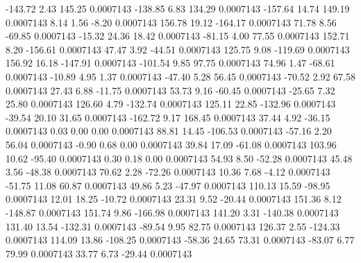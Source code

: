      -143.72        2.43      145.25     0.0007143
     -138.85        6.83      134.29     0.0007143
     -157.64       14.74      149.19     0.0007143
        8.14        1.56       -8.20     0.0007143
      156.78       19.12     -164.17     0.0007143
       71.78        8.56      -69.85     0.0007143
      -15.32       24.36       18.42     0.0007143
      -81.15        4.00       77.55     0.0007143
      152.71        8.20     -156.61     0.0007143
       47.47        3.92      -44.51     0.0007143
      125.75        9.08     -119.69     0.0007143
      156.92       16.18     -147.91     0.0007143
     -101.54        9.85       97.75     0.0007143
       74.96        1.47      -68.61     0.0007143
      -10.89        4.95        1.37     0.0007143
      -47.40        5.28       56.45     0.0007143
      -70.52        2.92       67.58     0.0007143
       27.43        6.88      -11.75     0.0007143
       53.73        9.16      -60.45     0.0007143
      -25.65        7.32       25.80     0.0007143
      126.60        4.79     -132.74     0.0007143
      125.11       22.85     -132.96     0.0007143
      -39.54       20.10       31.65     0.0007143
     -162.72        9.17      168.45     0.0007143
       37.44        4.92      -36.15     0.0007143
        0.03        0.00        0.00     0.0007143
       88.81       14.45     -106.53     0.0007143
      -57.16        2.20       56.04     0.0007143
       -0.90        0.68        0.00     0.0007143
       39.84       17.09      -61.08     0.0007143
      103.96       10.62      -95.40     0.0007143
        0.30        0.18        0.00     0.0007143
       54.93        8.50      -52.28     0.0007143
       45.48        3.56      -48.38     0.0007143
       70.62        2.28      -72.26     0.0007143
       10.36        7.68       -4.12     0.0007143
      -51.75       11.08       60.87     0.0007143
       49.86        5.23      -47.97     0.0007143
      110.13       15.59      -98.95     0.0007143
       12.01       18.25      -10.72     0.0007143
       23.31        9.52      -20.44     0.0007143
      151.36        8.12     -148.87     0.0007143
      151.74        9.86     -166.98     0.0007143
      141.20        3.31     -140.38     0.0007143
      131.40       13.54     -132.31     0.0007143
      -89.54        9.95       82.75     0.0007143
      126.37        2.55     -124.33     0.0007143
      114.09       13.86     -108.25     0.0007143
      -58.36       24.65       73.31     0.0007143
      -83.07        6.77       79.99     0.0007143
       33.77        6.73      -29.44     0.0007143
